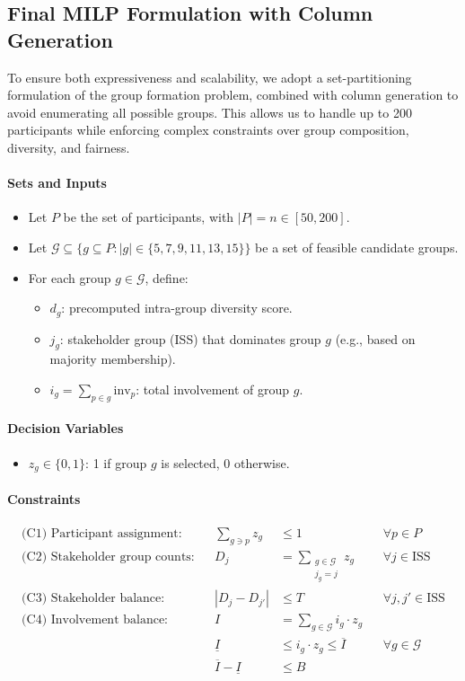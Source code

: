 \subsection*{Final MILP Formulation with Column Generation}

To ensure both expressiveness and scalability, we adopt a set-partitioning formulation of the group formation problem, combined with column generation to avoid enumerating all possible groups. This allows us to handle up to 200 participants while enforcing complex constraints over group composition, diversity, and fairness.

\paragraph{Sets and Inputs}
\begin{itemize}
    \item Let $P$ be the set of participants, with $|P| = n \in [50, 200]$.
    \item Let $\mathcal{G} \subseteq \{ g \subseteq P : |g| \in \{5,7,9,11,13,15\} \}$ be a set of feasible candidate groups.
    \item For each group $g \in \mathcal{G}$, define:
    \begin{itemize}
        \item $d_g$: precomputed intra-group diversity score.
        \item $j_g$: stakeholder group (ISS) that dominates group $g$ (e.g., based on majority membership).
        \item $i_g = \sum_{p \in g} \text{inv}_p$: total involvement of group $g$.
    \end{itemize}
\end{itemize}

\paragraph{Decision Variables}
\begin{itemize}
    \item $z_g \in \{0,1\}$: 1 if group $g$ is selected, 0 otherwise.
\end{itemize}

\paragraph{Constraints}
\begin{align*}
\text{(C1) Participant assignment:} && \sum_{g \ni p} z_g &\leq 1 && \forall p \in P \\
\text{(C2) Stakeholder group counts:} && D_j &= \sum_{\substack{g \in \mathcal{G} \\ j_g = j}} z_g && \forall j \in \text{ISS} \\
\text{(C3) Stakeholder balance:} && |D_j - D_{j'}| &\leq T && \forall j, j' \in \text{ISS} \\
\text{(C4) Involvement balance:} && I &= \sum_{g \in \mathcal{G}} i_g \cdot z_g \\
&& \underline{I} &\leq i_g \cdot z_g \leq \overline{I} && \forall g \in \mathcal{G} \\
&& \overline{I} - \underline{I} &\leq B
\end{align*}

